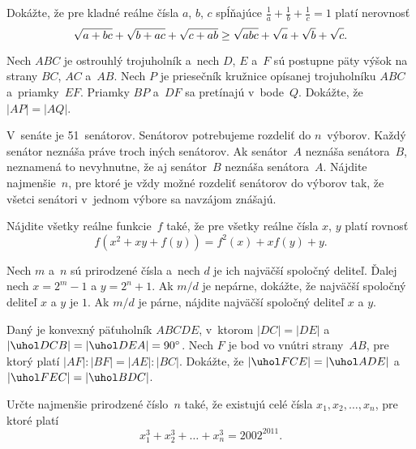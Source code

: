 {%
Dokážte, že pre kladné reálne čísla $a$, $b$, $c$ spĺňajúce $\frac1a+\frac1b+\frac1c=1$ platí nerovnosť
$$
\sqrt{a+bc}+\sqrt{b+ac}+\sqrt{c+ab} \ge \sqrt{abc}+\sqrt{\vphantom{b}a}+\sqrt{b}+\sqrt{\vphantom{b}c}.
$$
}

{%
Nech $ABC$ je ostrouhlý trojuholník a~nech $D$, $E$ a~$F$ sú postupne päty výšok na strany $BC$, $AC$ a~$AB$. Nech $P$ je priesečník kružnice opísanej trojuholníku $ABC$ a~priamky~$EF$. Priamky $BP$ a~$DF$ sa pretínajú v~bode~$Q$. Dokážte, že $|AP| = |AQ|$.
}

{%
V~senáte je 51~senátorov. Senátorov potrebujeme rozdeliť do $n$~výborov. Každý senátor neznáša práve troch iných senátorov. Ak senátor~$A$ neznáša senátora~$B$, neznamená to nevyhnutne, že aj senátor~$B$ neznáša senátora~$A$. Nájdite najmenšie~$n$, pre ktoré je vždy možné rozdeliť senátorov do výborov tak, že všetci senátori v~jednom výbore sa navzájom znášajú.}

{%
Nájdite všetky reálne funkcie~$f$ také, že pre všetky reálne čísla $x$, $y$ platí rovnosť
$$
f(x^2+xy+f(y)) = f^2(x)+xf(y)+y.
$$
}

{%
Nech $m$ a~$n$ sú prirodzené čísla a~nech $d$ je ich najväčší spoločný deliteľ. Ďalej nech $x = 2^m-1$ a $y = 2^n + 1$.
 Ak $m/d$ je nepárne, dokážte, že najväčší spoločný deliteľ $x$ a $y$ je $1$.
 Ak $m/d$ je párne, nájdite najväčší spoločný deliteľ $x$ a $y$.
}

{%
Daný je konvexný päťuholník $ABCDE$, v~ktorom $|DC| = |DE|$ a~$|\uhol DCB| = |\uhol DEA| = 90^{\circ}$.
Nech $F$ je bod vo vnútri strany~$AB$, pre ktorý platí $|AF|:|BF| = |AE|:|BC|$. Dokážte, že
$|\uhol FCE| = |\uhol ADE|$ a~$|\uhol FEC| = |\uhol BDC|$.}

{%
Určte najmenšie prirodzené číslo~$n$ také, že existujú celé čísla $x_1, x_2, \dots, x_n$, pre ktoré platí
$$
x_1^3 + x_2^3 + \dots + x_n^3 = 2002^{2011}.
$$}

